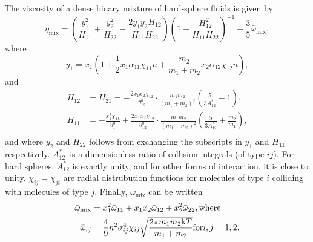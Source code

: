 The viscosity of a dense binary mixture of hard-sphere fluids is given by
\begin{equation}
    \eta_{\text{mix}} 
        = \left(
            \frac{y_1^2}{H_{11}} + \frac{y_2^2}{H_{22}} - \frac{2 y_1 y_2 H_{12}}{H_{11} H_{22}}
        \right)
        \left(
            1 - \frac{H_{12}^2}{H_{11} H_{22}}
        \right)^{-1}
        + \frac{3}{5} \bar{\omega}_{\text{mix}},
\end{equation}
where
\begin{equation}
    \label{eq:viscosity_binary}
    y_1 
        = x_1 \left(
            1 + \frac{1}{2} x_1 \alpha_{11} \chi_{11} n + \frac{m_2}{m_1 + m_2} x_2 \alpha_{12} \chi_{12} n
        \right), 
\end{equation}
and
\begin{equation}
    \begin{split}
        H_{12} &= H_{21}
                =   -\frac{2 x_1 x_2 \chi_{12}}{\eta^0_{12}}
                    \cdot \frac{m_1 m_2}{(m_1 + m_2)^2}
                    \left( \frac{5}{3A^*_{12}} - 1 \right), \\
        H_{11}
                &=  -\frac{x_1^2 \chi_{11}}{\eta^0_1}
                    +\frac{2 x_1 x_2 \chi_{12}}{\eta^0_{12}}
                    \cdot \frac{m_1 m_2}{(m_1 + m_2)^2}
                    \left( \frac{5}{3A^*_{12}} + \frac{m_2}{m_1} \right), \\
    \end{split}
\end{equation}
and where $y_2$ and $H_{22}$ follows from exchanging the subscripts in $y_1$ and $H_{11}$ respectively.
$A^*_{12}$ is a dimensionless ratio of collision integrals (of type ${ij}$).
For hard spheres, $A^*_{12}$ is exactly unity, and for other forms of interaction, it is close to unity.
$\chi_{ij} = \chi_{ji}$ are radial distrubution functions for molecules of type $i$ colliding with molecules of type $j$.
Finally, $\bar{\omega}_{\text{mix}}$ can be written
\begin{equation}
    \begin{split}
        \bar{\omega}_{\text{mix}} 
            &= x_1^2 \bar{\omega}_{11} + x_1 x_2 \bar{\omega}_{12} + x_2^2 \bar{\omega}_{22}, \text{where}\\
        \bar{\omega}_{ij} 
            &= \frac{4}{9} n^2 \sigma_{ij}^4 \chi_{ij} \sqrt{\frac{2\pi m_1 m_2 \mathrm{k} T}{m_1 + m_2}} \text{for} i,j = 1,2.
    \end{split}
\end{equation}

